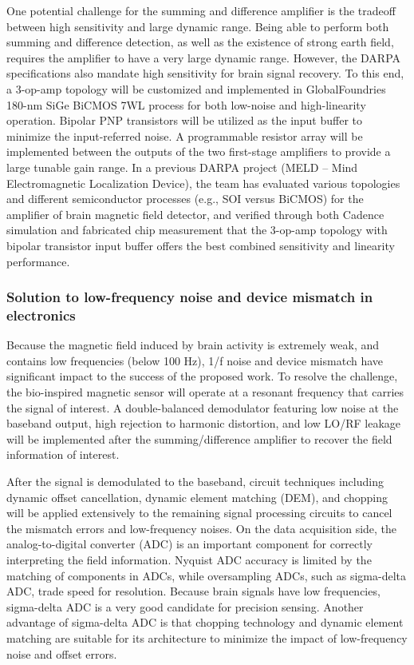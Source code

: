 One potential challenge for the summing and difference amplifier is the tradeoff between high sensitivity and large dynamic range. Being able to perform both summing and difference detection, as well as the existence of strong earth field, requires the amplifier to have a very large dynamic range. However, the DARPA specifications also mandate high sensitivity for brain signal recovery. To this end, a 3-op-amp topology will be customized and implemented in GlobalFoundries 180-nm SiGe BiCMOS 7WL process for both low-noise and high-linearity operation. Bipolar PNP transistors will be utilized as the input buffer to minimize the input-referred noise. A programmable resistor array will be implemented between the outputs of the two first-stage amplifiers to provide a large tunable gain range. In a previous DARPA project (MELD – Mind Electromagnetic Localization Device), the team has evaluated various topologies and different semiconductor processes (e.g., SOI versus BiCMOS) for the amplifier of brain magnetic field detector, and verified through both Cadence simulation and fabricated chip measurement that the 3-op-amp topology with bipolar transistor input buffer offers the best combined sensitivity and linearity performance.

\subsubsection{Solution to low-frequency noise and device mismatch in electronics}

Because the magnetic field induced by brain activity is extremely weak, and contains low frequencies (below 100 Hz), 1/f noise and device mismatch have significant impact to the success of the proposed work. To resolve the challenge, the bio-inspired magnetic sensor will operate at a resonant frequency that carries the signal of interest. A double-balanced demodulator featuring low noise at the baseband output, high rejection to harmonic distortion, and low LO/RF leakage will be implemented after the summing/difference amplifier to recover the field information of interest. 

After the signal is demodulated to the baseband, circuit techniques including dynamic offset cancellation, dynamic element matching (DEM), and chopping will be applied extensively to the remaining signal processing circuits to cancel the mismatch errors and low-frequency noises. On the data acquisition side, the analog-to-digital converter (ADC) is an important component for correctly interpreting the field information. Nyquist ADC accuracy is limited by the matching of components in ADCs, while oversampling ADCs, such as sigma-delta ADC, trade speed for resolution. Because brain signals have low frequencies, sigma-delta ADC is a very good candidate for precision sensing. Another advantage of sigma-delta ADC is that chopping technology and dynamic element matching are suitable for its architecture to minimize the impact of low-frequency noise and offset errors.


